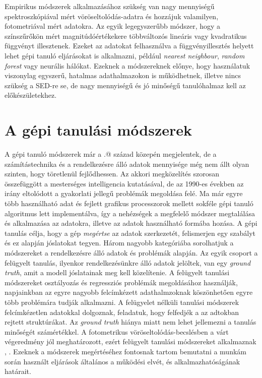 \documentclass[12pt,letterpaper,twoside,openright]{book}
\makeatletter
\newcommand*{\rom}[1]{\expandafter\@slowromancap\romannumeral #1@}
\makeatother
\begin{document}
\newline \indent
Empirikus módszerek alkalmazásához szükség van nagy mennyiségű spektroszkópiával mért vöröseltolódás-adatra és hozzájuk valamilyen, fotometriával mért adatokra. Az egyik legegyszerűbb módszer, hogy a színszűrőkön mért magnitúdóértékekere többváltozós lineáris vagy kvadratikus függvényt illesztenek\cite{connoly et al}. Ezeket az adatokat felhasználva a függvényillesztés helyett lehet gépi tanuló eljárásokat is alkalmazni, például \textit{nearest neighbour}\cite{app_photoz}, \textit{random forest}\cite{rf} vagy neurális hálókat\cite{mlrsone}.
Ezeknek a módszereknek előnye, hogy használatuk viszonylag egyszerű, hatalmas adathalmazokon is működhetnek, illetve nincs szükség a SED-re se, de nagy mennyiségű és jó minőségű tanulóhalmaz kell az előkészületekhez.

\section{A gépi tanulási módszerek}
A gépi tanuló módszerek már a \rom{20.} század közepén megjelentek, de a számítástechnika és a rendelkezésre álló adatok mennyisége még nem állt olyan szinten, hogy töretlenül fejlődhessen. Az akkori megközelítés szorosan összefüggött a mesterséges intelligencia kutatásával, de az 1990-es években az irány eltolódott a gyakorlati jellegű problémák megoldása felé. Ma már egyre több használható adat és fejlett grafikus processzorok mellett sokféle gépi tanuló algoritmus lett implementálva, így a nehézségek a megfelelő módszer megtalálása és alkalmazása az adatokra, illetve az adatok használható formába hozása. A  gépi tanulás célja, hogy a gép \textit{megértse} az adatok szerkezetét, felismerjen egy szabályt és ez alapján  jóslatokat tegyen. 
\newline \indent
 Három nagyobb kategóriába sorolhatjuk a módszereket a rendelkezésre álló adatok és problémák alapján. Az egyik csoport a felügyelt tanulás, ilyenkor rendelkezésünkre álló adatok jelöltek, van egy \textit{ground truth}, amit a modell jóslatainak meg kell közelítenie. A felügyelt tanulási módszereket osztályozás és regressziós problémák megoldásához használják, napjainkban az egyre nagyobb felcímkézett adathalmzoknak köszönhetően egyre több problémára tudják alkalmazni. A felügyelet nélküli tanulási módszerek felcímkézetlen adatokkal dolgoznak, feladatuk, hogy felfedjék a az adtokban rejtett struktúrákat. Az \textit{ground truth} hiánya miatt nem lehet jellemezni a tanulás minőségét számértékkel. 
A fotometrikus vöröseltolódás-becslésben a várt végeredmény jól meghatározott, ezért felügyelt tanulási módszereket alkalmaznak \cite{mlrsone}, \cite{mlrstwo}. Ezeknek a módszerek megértéséhez fontosnak tartom bemutatni a munkám során használt eljárások általános a működési elvét, és alkalmazhatóságának határait. 
\end{document}
